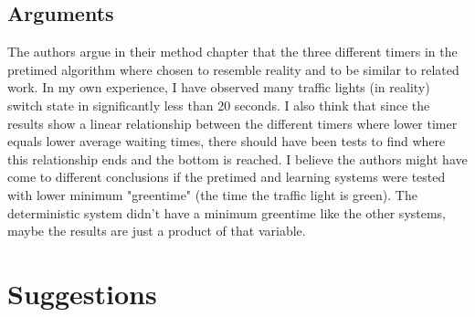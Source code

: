 \documentclass[10pt, a4paper]{article}
\begin{document}
\subsection{Arguments}
The authors argue in their method chapter that the three different timers in the pretimed algorithm where chosen to resemble reality and to
be similar to related work. In my own experience, I have observed many traffic lights (in reality) switch state in significantly less than
20 seconds. I also think that since the results show a linear relationship between the different timers where lower timer equals lower average
waiting times, there should have been tests to find where this relationship ends and the bottom is reached. I believe the authors might have
come to different conclusions if the pretimed and learning systems were tested with lower minimum "greentime" (the time the traffic light is green).
The deterministic system didn't have a minimum greentime like the other systems, maybe the results are just a product of that variable.



\section{Suggestions}




\end{document}
